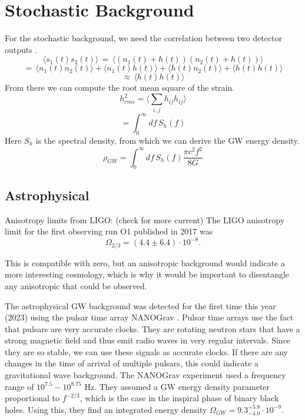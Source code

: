 \section{Stochastic Background}
For the stochastic background, we need the correlation between two detector
outputs \cite{christensen_stochastic_2019}.
\begin{equation}
    \langle s_1 (t) s_2(t)\rangle \, = \, \langle(n_1(t) + h(t))(n_2(t) + h(t))\rangle
\end{equation}
\begin{equation}
    = \, \langle n_1(t) n_2(t)\rangle + \langle n_1(t)h(t)\rangle + \langle h(t)n_2(t)\rangle  + \langle h(t)h(t)\rangle  
\end{equation}
\begin{equation}
    \approx \, \langle h(t)h(t)\rangle 
\end{equation}
From there we can compute the root mean square of the strain.
\begin{equation}
    h_{rms}^2 = \langle \sum_{i,j} h_{ij} h_{ij}\rangle 
\end{equation}
\begin{equation}
    = \int_0^\infty df \, S_h (f)
\end{equation}
Here $S_h$ is the spectral density, from which we can derive the GW energy
density.
\begin{equation}
    \rho_{GW} = \int_0^\infty df \, S_h(f) \frac{\pi c^2 f^2}{8G}
\end{equation} 
\subsection{Astrophysical}


Anisotropy limits from LIGO:
(check for more current)
The LIGO anisotropy limit for the first observing run O1 published in 2017
was 
\begin{equation}
    \Omega_{2/3} = (4.4 \pm 6.4) \cdot 10^{-8} .
\end{equation}

This is compatible with zero, but an anisotropic background would indicate
a more interesting cosmology, which is why it would be important to disentangle
any anisotropic that could be observed.

The astrophysical GW background was detected for the first time this year (2023) using the pulsar time array NANOGrav \cite{agazie_nanograv_2023}. Pulsar time arrays use the fact that pulsars are very accurate clocks. They are rotating neutron stars that have a strong magnetic field and thus emit radio waves in very regular intervals. Since they are so stable, we can use these signals as accurate clocks. If there are any changes in the time of arrival of multiple pulsars, this could indicate a gravitational wave background. 
The NANOGrav experiment used a frequency range of $10^{7.5} - 10^{8.75}$ Hz. They assumed a GW energy density parameter proportional to $f^{-2/3}$, which is the case in the inspiral phase of binary black holes. \cite{phinney_practical_2001}
Using this, they find an integrated energy density $\Omega_{GW} = 9.3^{+5.8}_{-4.0}\cdot 10^{-9}$.

